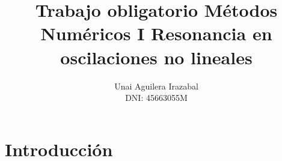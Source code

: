 \documentclass[11pt]{article}
\title{Trabajo obligatorio Métodos Numéricos I Resonancia en oscilaciones no lineales}
\author{Unai Aguilera Irazabal\\ DNI: 45663055M}
\begin{document}
\maketitle

\section{Introducción}
\end{document}
